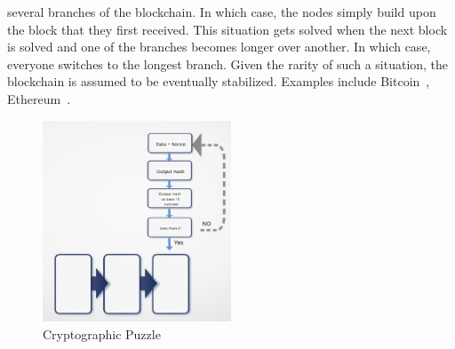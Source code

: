 several branches of the blockchain. In which case, the nodes simply build upon
the block that they first received. This situation gets solved when the next
block is solved and one of the branches becomes longer over another. In which
case, everyone switches to the longest branch. Given the rarity of such a
situation, the blockchain is assumed to be eventually stabilized. Examples
include Bitcoin~\cite{Bitcoin_Satoshi}, Ethereum~\cite{buterin2013ethereum}.
\begin{figure}
	\begin{center}
	\includegraphics[width=0.5\textwidth]{Images/CryptographicPuzzle.eps}
	\caption{Cryptographic Puzzle}
	\label{fig:cryptographicPuzzle}
	\end{center}
\end{figure}
